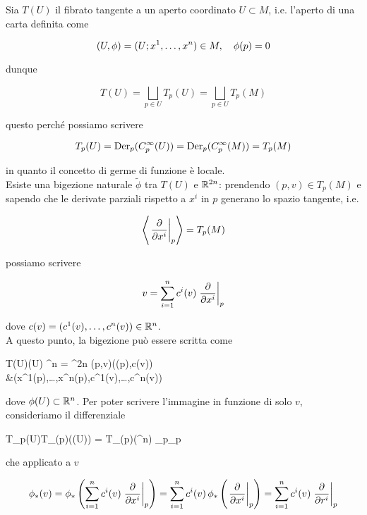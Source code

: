 Sia $ T(U) $ il fibrato tangente a un aperto coordinato $ U \subset M $, i.e. l'aperto di una carta definita come

\begin{equation}
	(U,\phi) = (U; x^{1},\dots,x^{n}) \in M \qcomma \phi(p) = 0
\end{equation}

dunque

\begin{equation}
	T(U) = \bigsqcup_{p \in U} T_{p}(U) = \bigsqcup_{p \in U} T_{p}(M)
\end{equation}

questo perché possiamo scrivere

\begin{equation}
	T_{p}(U) = \operatorname{Der}_{p}(C_{p}^{\infty}(U)) = \operatorname{Der}_{p}(C_{p}^{\infty}(M)) = T_{p}(M)
\end{equation}

in quanto il concetto di germe di funzione è locale.\\
Esiste una bigezione naturale $ \tilde{\phi} $ tra $ T(U) $ e $ \mathbb{R}^{2n} $: prendendo $ (p,v) \in T_{p}(M) $ e sapendo che le derivate parziali rispetto a $ x^{i} $ in $ p $ generano lo spazio tangente, i.e.

\begin{equation}
	\ev{ \eval{ \pdv{x^{i}} }_{p} } = T_{p}(M)
\end{equation}

possiamo scrivere

\begin{equation}
	v = \sum_{i=1}^{n} c^{i}(v) \eval{ \pdv{x^{i}} }_{p}
\end{equation}

dove $ c(v) = (c^{1}(v),\dots,c^{n}(v)) \in \mathbb{R}^{n} $.\\
A questo punto, la bigezione può essere scritta come

\map{\tilde{\phi}}
	{T(U)}{\phi(U) \times \R^{n} = \R^{2n}}
	{(p,v)}{(\phi(p),c(v)) \\
		&\mapsto (x^{1}(p),\dots,x^{n}(p),c^{1}(v),\dots,c^{n}(v))
		}

dove $ \phi(U) \subset \mathbb{R}^{n} $. Per poter scrivere l'immagine in funzione di solo $ v $, consideriamo il differenziale

	{T_{p}(U)}{T_{\phi(p)}(\phi(U)) =  T_{\phi(p)}(\R^{n})}
	{_{p}}{_{p}}

che applicato a $ v $

\begin{equation}
	\phi_{*}(v) = \phi_{*} \left( \sum_{i=1}^{n} c^{i}(v) \eval{ \pdv{x^{i}} }_{p} \right) %
	= \sum_{i=1}^{n} c^{i}(v) \, \phi_{*} \left( \eval{ \pdv{x^{i}} }_{p} \right) %
	= \sum_{i=1}^{n} c^{i}(v) \eval{ \pdv{r^{i}} }_{p}
\end{equation}

